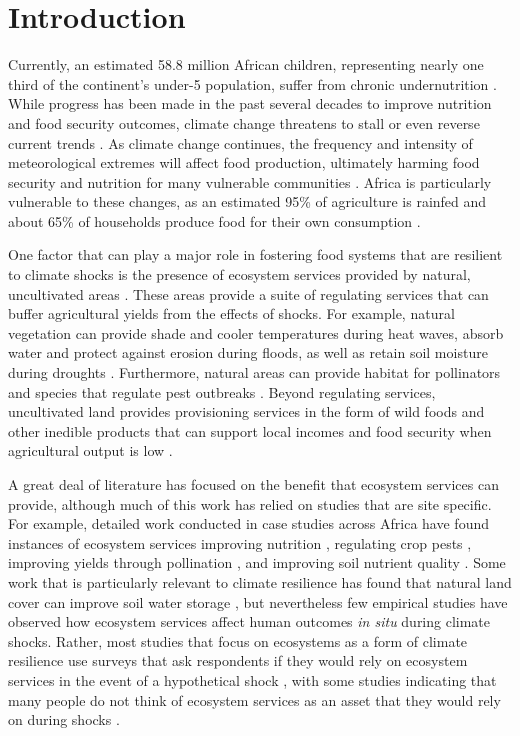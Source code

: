 \documentclass{article}
\begin{document}
\section{Introduction}

Currently, an estimated 58.8 million African children, representing nearly one third of the continent's under-5 population, suffer from chronic undernutrition \cite{unicef2019}.  While progress has been made in the past several decades to improve nutrition and food security outcomes, climate change threatens to stall or even reverse current trends \cite{FAO2018}.  As climate change continues, the frequency and intensity of meteorological extremes will affect food production, ultimately harming food security and nutrition for many vulnerable communities \cite{niles2020climate}.  Africa is particularly vulnerable to these changes, as an estimated 95\% of agriculture is rainfed \cite{Wani2009} and about 65\% of households produce food for their own consumption \cite{Runge2004}.

One factor that can play a major role in fostering food systems that are resilient to climate shocks is the presence of ecosystem services provided by natural, uncultivated areas \cite{Reed2016, Pascual2017, Daily2008}.  These areas provide a suite of regulating services that can buffer agricultural yields from the effects of shocks.  For example, natural vegetation can provide shade and cooler temperatures during heat waves, absorb water and protect against erosion during floods, as well as retain soil moisture during droughts \cite{Siriri2013, Lott2009}.  Furthermore, natural areas can provide habitat for pollinators and species that regulate pest outbreaks \cite{Karp2013}.  Beyond regulating services, uncultivated land provides provisioning services in the form of wild foods and other inedible products that can support local incomes and food security when agricultural output is low \cite{friant2019life, morgan2020secret, powell2015improving, Assogbadjo2012}.

A great deal of literature has focused on the benefit that ecosystem services can provide, although much of this work has relied on studies that are site specific.  For example, detailed work conducted in case studies across Africa have found instances of ecosystem services improving nutrition \cite{Golden2011}, regulating crop pests \cite{Girma2000}, improving yields through pollination \cite{Gemmill-Herren2008, Munyuli2012}, and improving soil nutrient quality \cite{Sileshi2012, Boffa2000, Siriri2009}.  Some work that is particularly relevant to climate resilience has found that natural land cover can improve soil water storage \cite{Siriri2013, Lott2009}, but nevertheless few empirical studies have observed how ecosystem services affect human outcomes \textit{in situ} during climate shocks.  Rather, most studies that focus on ecosystems as a form of climate resilience use surveys that ask respondents if they would rely on ecosystem services in the event of a hypothetical shock \cite{Robledo2012}, with some studies indicating that many people do not think of ecosystem services as an asset that they would rely on during shocks \cite{Wunder2014}.
\end{document}
